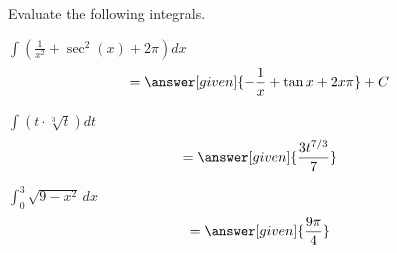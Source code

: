 \documentclass[handout]{ximera}
\begin{document}
\begin{problem}
Evaluate the following integrals.

\begin{question}
$\displaystyle\int\left(\frac{1}{x^2}+\sec^2(x)+2\pi\right)dx$
	\[
	\displaystyle  =    \answer[given]{-\frac{1}{x}+\tan{x}+2x\pi}+C
	\]
\end{question}

\begin{question}
$\displaystyle\int\left(t\cdot\sqrt[3]{t}\right)dt$
	\[
	\displaystyle  =    \answer[given]{\frac{3t^{7/3}}{7}}
	\]
\end{question}

\begin{question}
$\displaystyle\int_{0}^3\sqrt{9-x^2}\,dx$
	\[
	\displaystyle  =    \answer[given]{\frac{9\pi}{4}}
	\]
\end{question}

\end{problem}
\end{document}
